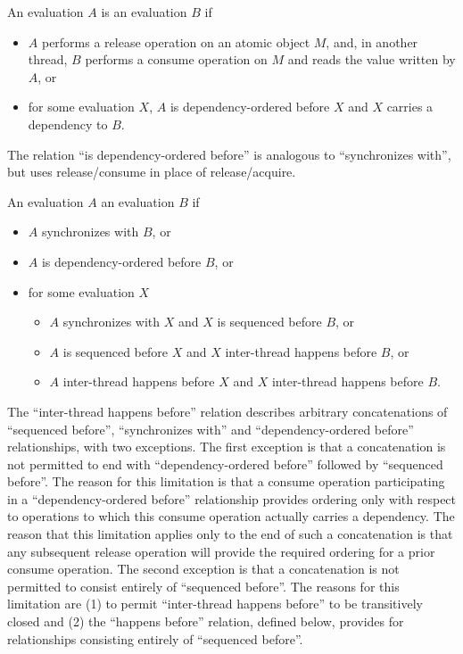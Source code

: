 \pnum
An evaluation $A$ is  an evaluation
$B$ if
\begin{itemize}
\item
$A$ performs a release operation on an atomic object $M$, and, in
another thread, $B$ performs a consume operation on $M$ and reads
the value written by $A$, or

\item
for some evaluation $X$, $A$ is dependency-ordered before $X$ and
$X$ carries a dependency to $B$.

\end{itemize}
\begin{note}
The relation ``is dependency-ordered before'' is analogous to
``synchronizes with'', but uses release/consume in place of release/acquire.
\end{note}

\pnum
An evaluation $A$  an evaluation $B$
if
\begin{itemize}
\item
  $A$ synchronizes with $B$, or
\item
  $A$ is dependency-ordered before $B$, or
\item
  for some evaluation $X$
  \begin{itemize}
  \item
    $A$ synchronizes with $X$ and $X$
    is sequenced before $B$, or
  \item
    $A$ is sequenced before $X$ and $X$
    inter-thread happens before $B$, or
  \item
    $A$ inter-thread happens before $X$ and $X$
    inter-thread happens before $B$.
  \end{itemize}
\end{itemize}
\begin{note}
The ``inter-thread happens before'' relation describes arbitrary
concatenations of ``sequenced before'', ``synchronizes with'' and
``dependency-ordered before'' relationships, with two exceptions. The first
exception is that a concatenation is not permitted to end with
``dependency-ordered before'' followed by ``sequenced before''. The reason for
this limitation is that a consume operation participating in a
``dependency-ordered before'' relationship provides ordering only with respect
to operations to which this consume operation actually carries a dependency. The
reason that this limitation applies only to the end of such a concatenation is
that any subsequent release operation will provide the required ordering for a
prior consume operation. The second exception is that a concatenation is not
permitted to consist entirely of ``sequenced before''. The reasons for this
limitation are (1) to permit ``inter-thread happens before'' to be transitively
closed and (2) the ``happens before'' relation, defined below, provides for
relationships consisting entirely of ``sequenced before''.
\end{note}

